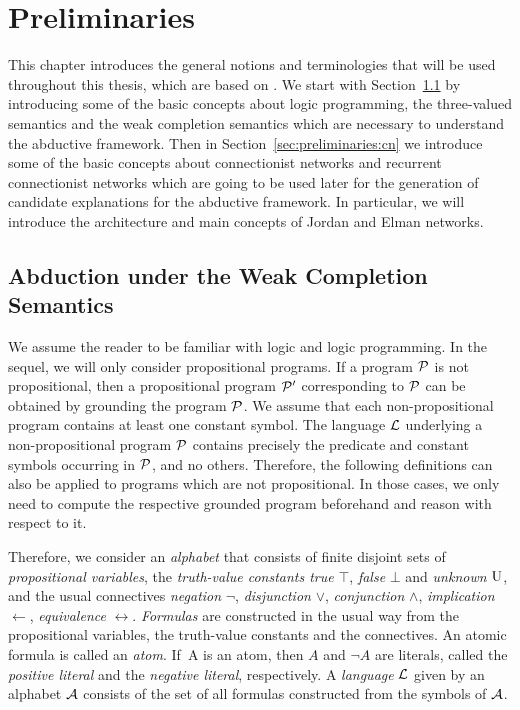 
\chapter{Preliminaries}
\label{sec:preliminaries}

This chapter introduces the general notions and terminologies that will be used throughout this thesis, which are based on \cite{holldobler2009logic, lloyd2012foundations}. We start with Section~\ref{sec:preliminaries:abduction} by introducing some of the basic concepts about logic programming, the three-valued semantics and the weak completion semantics which are necessary to understand the abductive framework. Then in Section~\ref{sec:preliminaries:cn} we introduce some of the basic concepts about connectionist networks and recurrent connectionist networks which are going to be used later for the generation of candidate explanations for the abductive framework. In particular, we will introduce the architecture and main concepts of Jordan and Elman networks.

\section{Abduction under the Weak Completion Semantics}
\label{sec:preliminaries:abduction}

We assume the reader to be familiar with logic and logic programming. In the sequel, we will only consider propositional programs. If a program $\mathcal{P}$ is not propositional, then a propositional program $\mathcal{P}'$ corresponding to $\mathcal{P}$ can be obtained by grounding the program $\mathcal{P}$. We assume that each non-propositional program contains at least one constant symbol. The language $\mathcal{L}$ underlying a non-propositional program $\mathcal{P}$ contains precisely the predicate and constant symbols occurring in $\mathcal{P}$, and no others. Therefore, the following definitions can also be applied to programs which are not propositional. In those cases, we only need to compute the respective grounded program beforehand and reason with respect to it.

Therefore, we consider an \textit{alphabet} that consists of finite disjoint sets of \textit{propositional variables}, the \textit{truth-value constants true} $\top$, \textit{false} $\bot$ and \textit{unknown} $\mbox{\normalfont U}$, and the usual connectives \textit{negation} $\neg$, \textit{disjunction} $\vee$, \textit{conjunction} $\wedge$, \textit{implication} $\leftarrow$, \textit{equivalence} $\leftrightarrow$. \textit{Formulas} are constructed in the usual way from the propositional variables, the truth-value constants and the connectives. An atomic formula is called an \textit{atom}. If~A is an atom, then $A$ and $\neg A$ are literals, called the \textit{positive literal} and the \textit{negative literal}, respectively. A \textit{language} $\mathcal{L}$ given by an alphabet $\mathcal{A}$ consists of the set of all formulas constructed from the symbols of $\mathcal{A}$.
 
